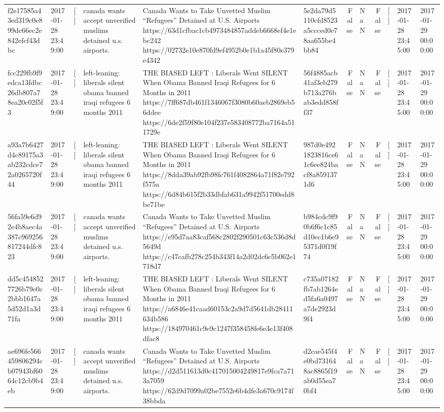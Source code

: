 \begin{tabular}{llllllrlrlll}
f2e17585a43ed319c0e899dc66ec2e842efcf43dbc & 2017-01-28 23:49:00 & [] & canada wants accept unverified muslims detained u.s. airports. & Canada Wants to Take Unvetted Muslim “Refugees” Detained at U.S. Airports https://63d1cfbac1cb4973484857addeb6668ef4e1ebc242 https://02732e10e870fd9ef4952b0e1b1a45f80e379e4342 & 5e2da79d5110cfd8523a5ccced0e78aa655be4bb84 & False & NaN & False & [] & 2017-01-28 23:45:00 & 2017-01-29 00:00:00 \\
fcc229fb9f9edca13fdbc26db807a78ea20c02f5f3 & 2017-01-28 23:49:00 & [] & left-leaning: liberals silent obama banned iraqi refugees 6 months 2011 & THE BIASED LEFT : Liberals Went SILENT When Obama Banned Iraqi Refugees for 6 Months in 2011 https://7ff687db461f1346067f3080b60aeb2869eb56ddee https://6de2f59f80e104f237e583408772ba7164a511729e & 56f4885acb41af3eb279b713a276bab3edd858ff37 & False & NaN & False & [] & 2017-01-28 23:45:00 & 2017-01-29 00:00:00 \\
a93a7b6427d4c89175a3ab232cdce72a0265720f44 & 2017-01-28 23:49:00 & [] & left-leaning: liberals silent obama banned iraqi refugees 6 months 2011 & THE BIASED LEFT : Liberals Went SILENT When Obama Banned Iraqi Refugees for 6 Months in 2011 https://8dda39ab92fb98fc761f4082864a71f82e792f575a https://6d84b615f2b33dbfab631a9942f51700edd8be71be & 987d0e4921823816ce61c6ee824bacf8a8591371d6 & False & NaN & False & [] & 2017-01-28 23:45:00 & 2017-01-29 00:00:00 \\
56fa59e6d92e4b8aec4a387c969256817244dfc823 & 2017-01-28 23:49:00 & [] & canada wants accept unverified muslims detained u.s. airports. & Canada Wants to Take Unvetted Muslim “Refugees” Detained at U.S. Airports https://e95d7aa83caf568c2802f290501c63c536d8d5649d https://c47cafb278c254b343f14a2d02dc6c5b062e1718d7 & b984cdc9f90b6f6c1c85d10ec1b6e95371d0f19f74 & False & NaN & False & [] & 2017-01-28 23:45:00 & 2017-01-29 00:00:00 \\
dd5c4548527726b79e0c2bbb1647a5d52d1a3d71fa & 2017-01-28 23:49:00 & [] & left-leaning: liberals silent obama banned iraqi refugees 6 months 2011 & THE BIASED LEFT : Liberals Went SILENT When Obama Banned Iraqi Refugees for 6 Months in 2011 https://a6846e41caad60153c2a9d7d5641db28411634b586 https://184970461c9e9c1247f358458fe6e3e13f408dfac8 & c735a07182fb7ab1264ed5fa6a0497a7de2923d9f4 & False & NaN & False & [] & 2017-01-28 23:45:00 & 2017-01-29 00:00:00 \\
ae696fe566459806294cb07943bf6064c12cb9b4eb & 2017-01-28 23:49:00 & [] & canada wants accept unverified muslims detained u.s. airports. & Canada Wants to Take Unvetted Muslim “Refugees” Detained at U.S. Airports https://d2d511613d0c417015004249817e9fca7a713a7059 https://62d9d7099a02be7552e6b4dfe3a670c9174f38bbda & d2cae545f4e0bd731648ac8865f19ab0d55ea70bf4 & False & NaN & False & [] & 2017-01-28 23:45:00 & 2017-01-29 00:00:00 \\

\end{tabular}
